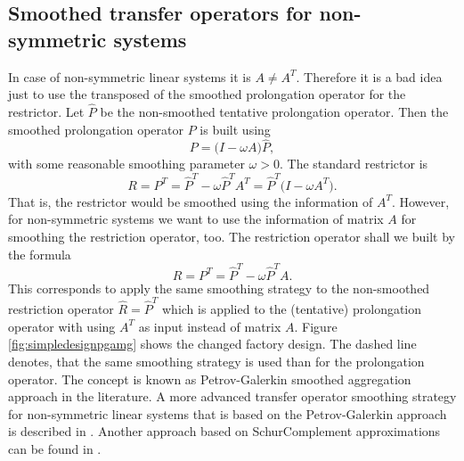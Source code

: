 \documentclass[10pt,fleqn]{book}
\begin{document}
\subsection{Smoothed transfer operators for non-symmetric systems}
In case of non-symmetric linear systems it is $A\neq A^T$. Therefore it is a bad idea just to use the transposed of the smoothed prolongation operator for the restrictor. Let $\widehat{P}$ be the non-smoothed tentative prolongation operator. Then the smoothed prolongation operator $P$ is built using
\begin{displaymath}
P = \bigl(I-\omega A\bigr) \widehat{P},
\end{displaymath}
with some reasonable smoothing parameter $\omega>0$.
The standard restrictor is
\begin{displaymath}
R = P^T = \widehat{P}^T - \omega \widehat{P}^T A^T = \widehat{P}^T\bigl(I-\omega A^T\bigr).
\end{displaymath}
That is, the restrictor would be smoothed using the information of $A^T$. However, for non-symmetric systems we want to use the information of matrix $A$ for smoothing the restriction operator, too. The restriction operator shall we built by the formula
\begin{displaymath}
R = P^T = \widehat{P}^T - \omega \widehat{P}^T A.
\end{displaymath}
This corresponds to apply the same smoothing strategy to the non-smoothed restriction operator $\widehat{R}=\widehat{P}^T$ which is applied to the (tentative) prolongation operator with using $A^T$ as input instead of matrix $A$. Figure \ref{fig:simpledesignpgamg} shows the changed factory design. The dashed line denotes, that the same smoothing strategy is used than for the prolongation operator. The concept is known as Petrov-Galerkin smoothed aggregation approach in the literature.
A more advanced transfer operator smoothing strategy for non-symmetric linear systems that is based on the Petrov-Galerkin approach is described in \cite{sala2008}. Another approach based on SchurComplement approximations can be found in \cite{wiesner2013}.
\end{document}
